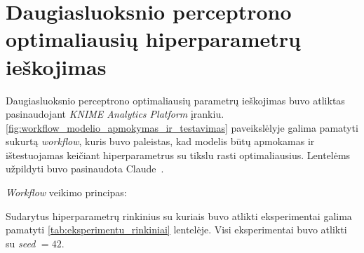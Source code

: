 \section{Daugiasluoksnio perceptrono optimaliausių hiperparametrų ieškojimas}
\label{sec:daugiasluoksnio_perceptrono_optimaliausiu_hiperparametru_ieskojimas}

Daugiasluoksnio perceptrono optimaliausių parametrų ieškojimas buvo atliktas pasinaudojant \textit{KNIME Analytics Platform} \cite{KNIME} įrankiu. \ref{fig:workflow_modelio_apmokymas_ir_testavimas} paveikslėlyje galima pamatyti sukurtą \textit{workflow}, kuris buvo paleistas, kad modelis būtų apmokamas ir ištestuojamas keičiant hiperparametrus su tikslu rasti optimaliausius. Lentelėms užpildyti buvo pasinaudota Claude~\cite{claude_bendrai}.



\textit{Workflow} veikimo principas:


Sudarytus hiperparametrų rinkinius su kuriais buvo atlikti eksperimentai galima pamatyti \ref{tab:eksperimentu_rinkiniai} lentelėje. Visi eksperimentai buvo atlikti su \textit{seed} $= 42$.



